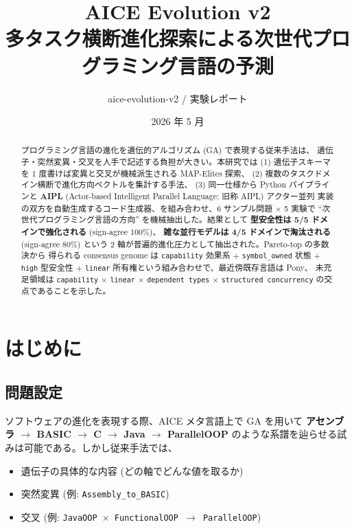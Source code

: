 \documentclass[a4paper,11pt]{article}
\title{\textbf{AICE Evolution v2}\\[2mm]
       \large 多タスク横断進化探索による次世代プログラミング言語の予測}
\author{aice-evolution-v2 / 実験レポート}
\date{2026 年 5 月}
\begin{document}
\maketitle

\begin{abstract}
\noindent
プログラミング言語の進化を遺伝的アルゴリズム (GA) で表現する従来手法は、
遺伝子・突然変異・交叉を人手で記述する負担が大きい。本研究では (1)
遺伝子スキーマを 1 度書けば変異と交叉が機械派生される MAP-Elites 探索、
(2) 複数のタスクドメイン横断で進化方向ベクトルを集計する手法、
(3) 同一仕様から Python パイプラインと {\bfseries AIPL}
(Actor-based Intelligent Parallel Language; 旧称 AIPL) アクター並列
実装の双方を自動生成するコード生成器、を組み合わせ、6 サンプル問題
\(\times\) 5 実験で
``次世代プログラミング言語の方向'' を機械抽出した。結果として
{\bfseries 型安全性は 5/5 ドメインで強化される} (sign-agree 100\%)、
{\bfseries 雑な並行モデルは 4/5 ドメインで淘汰される} (sign-agree 80\%)
という 2 軸が普遍的進化圧力として抽出された。Pareto-top の多数決から
得られる consensus genome は \texttt{capability} 効果系 \(+\)
\texttt{symbol\_owned} 状態 \(+\) \texttt{high} 型安全性 \(+\)
\texttt{linear} 所有権という組み合わせで、最近傍既存言語は Pony、
未充足領域は \texttt{capability} \(\times\) \texttt{linear} \(\times\)
\texttt{dependent types} \(\times\) \texttt{structured concurrency}
の交点であることを示した。
\end{abstract}

\section{はじめに}

\subsection{問題設定}

ソフトウェアの進化を表現する際、AICE メタ言語上で GA を用いて
{\bfseries アセンブラ \(\rightarrow\) BASIC \(\rightarrow\) C \(\rightarrow\) Java \(\rightarrow\) ParallelOOP}
のような系譜を辿らせる試みは可能である。しかし従来手法では、

\begin{itemize}
  \item 遺伝子の具体的な内容 (どの軸でどんな値を取るか)
  \item 突然変異 (例: \texttt{Assembly\_to\_BASIC})
  \item 交叉 (例: \texttt{JavaOOP \(\times\) FunctionalOOP \(\to\) ParallelOOP})
\end{itemize}
\end{document}
